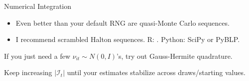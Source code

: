 \documentclass[aspectratio=169,t,11pt,table]{beamer}
\begin{document}
\begin{frame}{Numerical Integration}
\begin{wideitemize}
{\begin{itemize}
                \item Even better than your default RNG are \alert{quasi-Monte Carlo} sequences.
                \item I recommend scrambled Halton sequences. R: \cite{owen2017randomized}. Python: SciPy or PyBLP.
            \end{itemize}
        }
        \pause
        \item If you just need a few $\nu_{it} \sim N(0, I)$'s, try out \alert{Gauss-Hermite quadrature}.
        \pause
        \item \alert{Keep increasing $|\mathcal{I}_t|$} until your estimates stabilize across draws/starting values.
    \end{wideitemize}
\end{frame}
\end{document}
